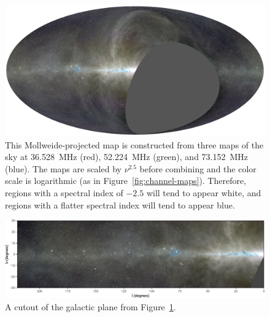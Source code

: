 \documentclass[twocolumn]{aastex61}
\begin{document}
\begin{figure}[t]
    \centering
    \includegraphics[width=\textwidth]{figures/three-color/ovro-lwa-sky-map.pdf}
    \caption{
        This Mollweide-projected map is constructed from three maps of the sky at 36.528~MHz (red),
        52.224~MHz (green), and 73.152~MHz (blue). The maps are scaled by $\nu^{2.5}$ before
        combining and the color scale is logarithmic (as in Figure~\ref{fig:channel-maps}).
        Therefore, regions with a spectral index of $-2.5$ will tend to appear white, and regions
        with a flatter spectral index will tend to appear blue.
    }
    \label{fig:three-color}
\end{figure}

\begin{figure}[t]
    \centering
    \includegraphics[width=\textwidth]{figures/three-color/ovro-lwa-galactic-plane.pdf}
    \caption{
        A cutout of the galactic plane from Figure~\ref{fig:three-color}.
    }
    \label{fig:galactic-plane-cutout}
\end{figure}
\end{document}
